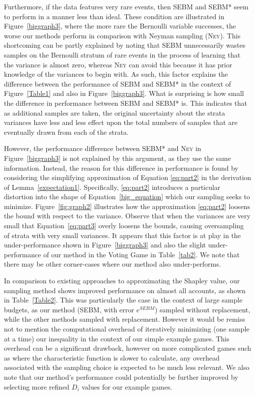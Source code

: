 Furthermore, if the data features very rare events, then SEBM and SEBM* seem to perform in a manner less than ideal.
These condition are illustrated in Figure~\ref{biggraph3}, where the more rare the Bernoulli variable successes, the worse our methods perform in comparison with Neyman sampling (\textsc{Ney}).
This shortcoming can be partly explained by noting that SEBM unnecessarily wastes samples on the Bernoulli stratum of rare events in the process of learning that the variance is almost zero, whereas \textsc{Ney} can avoid this because it has prior knowledge of the variances to begin with. 
As such, this factor explains the difference between the performance of SEBM and SEBM* in the context of Figure~\ref{Table1} and also in Figure~\ref{biggraph3}.
What is surprising is how small the difference in performance between SEBM and SEBM* is. 
This indicates that as additional samples are taken, the original uncertainty about the strata variances have less and less effect upon the total numbers of samples that are eventually drawn from each of the strata.

However, the performance difference between SEBM* and \textsc{Ney} in Figure~\ref{biggraph3} is not explained by this argument, as they use the same information.
Instead, the reason for this difference in performance is found by considering the simplifying approximation of Equation \eqref{eq:part2} in the derivation of Lemma~\ref{expectation1}. 
Specifically, \eqref{eq:part2} introduces a particular distortion into the shape of Equation~\eqref{big_equation} which our sampling seeks to minimize.
Figure~\ref{fig:graph2} illustrates how the approximation \eqref{eq:part2} loosens the bound with respect to the variance. 
Observe that when the variances are very small that Equation~\eqref{eq:part3} overly loosens the bounds, causing oversampling of strata with very small variances. 
It appears that this factor is at play in the under-performance shown in Figure~\ref{biggraph3} and also the slight under-performance of our method in the Voting Game in Table~\ref{tab2}. 
We note that there may be other corner-cases where our method also under-performs.

In comparison to existing approaches to approximating the Shapley value, our sampling method shows improved performance on almost all accounts, as shown in Table~\ref{Table2}.
This was particularly the case in the context of large sample budgets, as our method (SEBM, with error $e^{SEBM}$) sampled without replacement, while the other methods sampled with replacement. 
However it would be remiss not to mention the computational overhead of iteratively minimizing (one sample at a time) our inequality in the context of our simple example games. 
This overhead can be a significant drawback, however on more complicated games such as where the characteristic function is slower to calculate, any overhead associated with the sampling choice is expected to be much less relevant. 
We also note that our method's performance could potentially be further improved by selecting more refined $D_i$ values for our example games.

